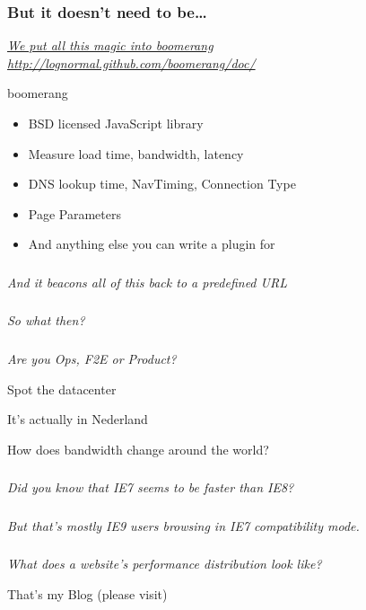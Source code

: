 \documentclass{beamer}
\newcommand{\innersplash}[1]{
  \begin{center}
    \Large \textrm{\textit{ #1 } }
  \end{center}
}
\newcommand{\splashslide}[2][{}]{
  \begin{frame}
  \frametitle{#1}
  \innersplash{#2}
  \end{frame}
}
\begin{document}
\splashslide[But it doesn't need to be\ldots]{\href{http://lognormal.github.com/boomerang/doc/}{We put all this magic into boomerang \\ \small http://lognormal.github.com/boomerang/doc/}}

\begin{frame}{boomerang}
  \begin{itemize}
    \item BSD licensed JavaScript library
    \item Measure load time, bandwidth, latency
    \item DNS lookup time, NavTiming, Connection Type
    \item Page Parameters
    \item And anything else you can write a plugin for
  \end{itemize}
\end{frame}

\splashslide{And it beacons all of this back to a predefined URL}

\splashslide{So what then?}

\splashslide{Are you Ops, F2E or Product?}

\begin{frame}{Spot the datacenter}
\end{frame}

\begin{frame}{It's actually in Nederland}
\end{frame}

\begin{frame}{How does bandwidth change around the world?}
\end{frame}

\splashslide{Did you know that IE7 seems to be faster than IE8?}
\splashslide{But that's mostly IE9 users browsing in IE7 compatibility mode.}

\splashslide{What does a website's performance distribution look like?}

\begin{frame}{That's my Blog (please visit)}
\end{frame}
\end{document}
